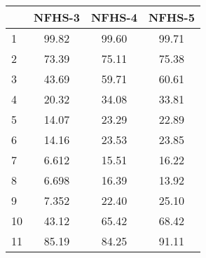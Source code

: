 \begin{tabular}{l*{3}{c}}
\toprule
            &\multicolumn{1}{c}{NFHS-3}&\multicolumn{1}{c}{NFHS-4}&\multicolumn{1}{c}{NFHS-5}\\
\midrule
\midrule
1           &       99.82&       99.60&       99.71\\
2           &       73.39&       75.11&       75.38\\
3           &       43.69&       59.71&       60.61\\
4           &       20.32&       34.08&       33.81\\
5           &       14.07&       23.29&       22.89\\
6           &       14.16&       23.53&       23.85\\
7           &       6.612&       15.51&       16.22\\
8           &       6.698&       16.39&       13.92\\
9           &       7.352&       22.40&       25.10\\
10          &       43.12&       65.42&       68.42\\
11          &       85.19&       84.25&       91.11\\
\bottomrule
\end{tabular}
